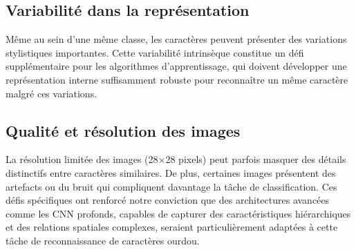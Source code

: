 \subsection{Variabilité dans la représentation}

\begin{flushleft}
Même au sein d'une même classe, les caractères peuvent présenter des variations stylistiques importantes. Cette variabilité intrinsèque constitue un défi supplémentaire pour les algorithmes d'apprentissage, qui doivent développer une représentation interne suffisamment robuste pour reconnaître un même caractère malgré ces variations.
\end{flushleft}

\subsection{ Qualité et résolution des images}
\begin{flushleft}
La résolution limitée des images (28×28 pixels) peut parfois masquer des détails distinctifs entre caractères similaires. De plus, certaines images présentent des artefacts ou du bruit qui compliquent davantage la tâche de classification.
Ces défis spécifiques ont renforcé notre conviction que des architectures avancées comme les CNN profonds, capables de capturer des caractéristiques hiérarchiques et des relations spatiales complexes, seraient particulièrement adaptées à cette tâche de reconnaissance de caractères ourdou.
\end{flushleft}